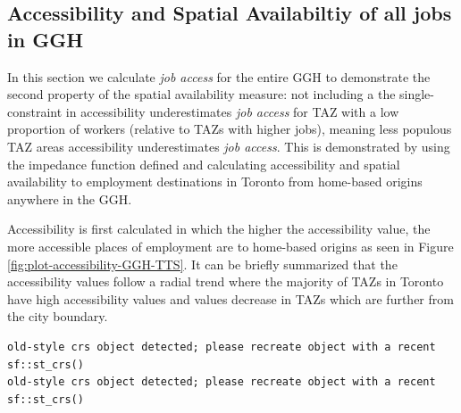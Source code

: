 \documentclass[]{elsarticle} %
\begin{document}
\hypertarget{accessibility-and-spatial-availabiltiy-of-all-jobs-in-ggh}{%
\subsection{Accessibility and Spatial Availabiltiy of all jobs in
GGH}\label{accessibility-and-spatial-availabiltiy-of-all-jobs-in-ggh}}

In this section we calculate \emph{job access} for the entire GGH to
demonstrate the second property of the spatial availability measure: not
including a the single-constraint in accessibility underestimates
\emph{job access} for TAZ with a low proportion of workers (relative to
TAZs with higher jobs), meaning less populous TAZ areas accessibility
underestimates \emph{job access}. This is demonstrated by using the
impedance function defined and calculating accessibility and spatial
availability to employment destinations in Toronto from home-based
origins anywhere in the GGH.

Accessibility is first calculated in which the higher the accessibility
value, the more accessible places of employment are to home-based
origins as seen in Figure \ref{fig:plot-accessibility-GGH-TTS}. It can
be briefly summarized that the accessibility values follow a radial
trend where the majority of TAZs in Toronto have high accessibility
values and values decrease in TAZs which are further from the city
boundary.

\begin{verbatim}
old-style crs object detected; please recreate object with a recent sf::st_crs()
old-style crs object detected; please recreate object with a recent sf::st_crs()
\end{verbatim}
\end{document}
